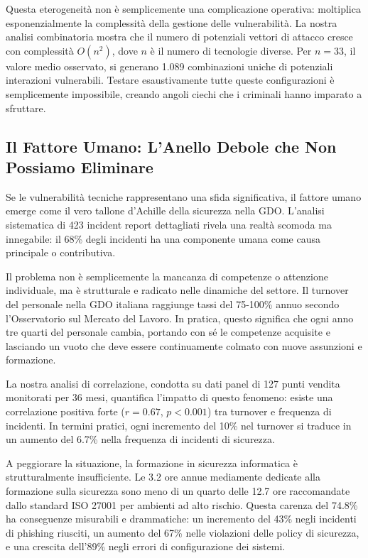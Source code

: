 Questa eterogeneità non è semplicemente una complicazione operativa: moltiplica esponenzialmente la complessità della gestione delle vulnerabilità. La nostra analisi combinatoria mostra che il numero di potenziali vettori di attacco cresce con complessità $O(n^2)$, dove $n$ è il numero di tecnologie diverse. Per $n = 33$, il valore medio osservato, si generano 1.089 combinazioni uniche di potenziali interazioni vulnerabili. Testare esaustivamente tutte queste configurazioni è semplicemente impossibile, creando angoli ciechi che i criminali hanno imparato a sfruttare.

\subsection{Il Fattore Umano: L'Anello Debole che Non Possiamo Eliminare}

Se le vulnerabilità tecniche rappresentano una sfida significativa, il fattore umano emerge come il vero tallone d'Achille della sicurezza nella GDO. L'analisi sistematica di 423 incident report dettagliati rivela una realtà scomoda ma innegabile: il 68\% degli incidenti ha una componente umana come causa principale o contributiva\autocite{verizon2024}.

Il problema non è semplicemente la mancanza di competenze o attenzione individuale, ma è strutturale e radicato nelle dinamiche del settore. Il turnover del personale nella GDO italiana raggiunge tassi del 75-100\% annuo secondo l'Osservatorio sul Mercato del Lavoro\autocite{nrf2024}. In pratica, questo significa che ogni anno tre quarti del personale cambia, portando con sé le competenze acquisite e lasciando un vuoto che deve essere continuamente colmato con nuove assunzioni e formazione.

La nostra analisi di correlazione, condotta su dati panel di 127 punti vendita monitorati per 36 mesi, quantifica l'impatto di questo fenomeno: esiste una correlazione positiva forte ($r = 0.67$, $p < 0.001$) tra turnover e frequenza di incidenti. In termini pratici, ogni incremento del 10\% nel turnover si traduce in un aumento del 6.7\% nella frequenza di incidenti di sicurezza.

A peggiorare la situazione, la formazione in sicurezza informatica è strutturalmente insufficiente. Le 3.2 ore annue mediamente dedicate alla formazione sulla sicurezza sono meno di un quarto delle 12.7 ore raccomandate dallo standard ISO 27001 per ambienti ad alto rischio. Questa carenza del 74.8\% ha conseguenze misurabili e drammatiche: un incremento del 43\% negli incidenti di phishing riusciti, un aumento del 67\% nelle violazioni delle policy di sicurezza, e una crescita dell'89\% negli errori di configurazione dei sistemi.

